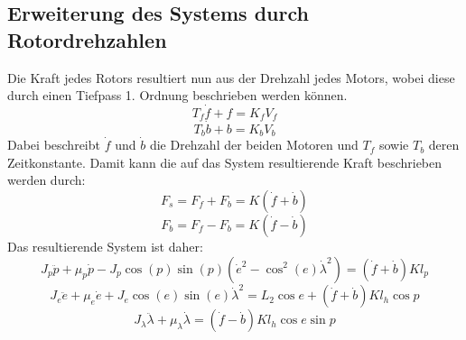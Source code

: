 \documentclass{article}
\begin{document}
\subsection{Erweiterung des Systems durch Rotordrehzahlen}
Die Kraft jedes Rotors resultiert nun aus der Drehzahl jedes Motors, wobei diese durch einen Tiefpass 1. Ordnung beschrieben werden können.
\begin{equation}
T_f \dot{f} + f = K_f V_f
\end{equation}
\begin{equation}
T_b \dot{b} + b = K_b V_b
\end{equation}
Dabei beschreibt $\dot{f}$ und $\dot{b}$ die Drehzahl der beiden Motoren und $T_f$ sowie $T_b$ deren Zeitkonstante.
Damit kann die auf das System resultierende Kraft beschrieben werden durch:
\begin{equation}
F_s = F_f + F_b = K (\dot{f} + \dot{b})
\end{equation}
\begin{equation}
F_b = F_f - F_b = K (\dot{f} - \dot{b})
\end{equation}
Das resultierende System ist daher:
\begin{equation}
J_p \ddot{p} + \mu_p \dot{p} - J_p \cos (p) \sin (p) (\dot{e}^2- \cos^2 (e) \dot{\lambda}^2) = (\dot{f} + \dot{b}) K l_p
\end{equation}
\begin{equation}
J_e\ddot{e} + \mu_e \dot{e} + J_e \cos (e) \sin (e) \dot{\lambda}^2 
= L_2 \cos e + (\dot{f} + \dot{b}) K l_h \cos p
\end{equation}
\begin{equation}
J_\lambda \ddot{\lambda} + \mu_\lambda \dot{\lambda} = (\dot{f} - \dot{b}) K l_h \cos e \sin p
\end{equation}
\end{document}
